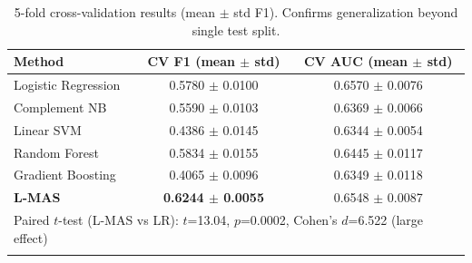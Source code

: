 \begin{table}[htbp]
\centering
\caption{5-fold cross-validation results (mean $\pm$ std F1). Confirms generalization beyond single test split.}
\label{tab:cv_results}
\begin{tabular}{lcc}
\toprule
\textbf{Method} & \textbf{CV F1 (mean $\pm$ std)} & \textbf{CV AUC (mean $\pm$ std)} \\
\midrule
Logistic Regression & 0.5780 $\pm$ 0.0100 & 0.6570 $\pm$ 0.0076 \\
Complement NB & 0.5590 $\pm$ 0.0103 & 0.6369 $\pm$ 0.0066 \\
Linear SVM & 0.4386 $\pm$ 0.0145 & 0.6344 $\pm$ 0.0054 \\
Random Forest & 0.5834 $\pm$ 0.0155 & 0.6445 $\pm$ 0.0117 \\
Gradient Boosting & 0.4065 $\pm$ 0.0096 & 0.6349 $\pm$ 0.0118 \\
\textbf{L-MAS} & \textbf{0.6244 $\pm$ 0.0055} & 0.6548 $\pm$ 0.0087 \\
\midrule
\multicolumn{3}{l}{\footnotesize Paired $t$-test (L-MAS vs LR): $t$=13.04, $p$=0.0002, Cohen's $d$=6.522 (large effect)} \\\\
\bottomrule
\end{tabular}
\end{table}